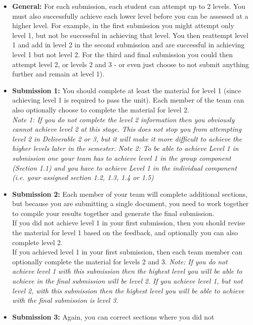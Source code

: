 \documentclass[a4paper, 11pt]{report}
\begin{document}
	\begin{itemize}
		\item \textbf{General:} For each submission, each student can attempt up to 2 
		levels. You must also successfully achieve each lower level before you can be 
		assessed at a higher level. For example, in the first submission you might attempt 
		only level 1, but not be successful in achieving that level. You then reattempt 
		level 1 and add in level 2 in the second submission and are successful in achieving
		level 1 but not level 2. For the third and final submission you could then attempt 
		level 2, or levels 2 and 3 - or even just choose to not submit anything further and
		remain at level 1).
		\item \textbf{Submission 1:} You should complete at least the material for 
		level 1 (since achieving level 1 is required to pass the unit). Each member of the 
		team can also optionally choose to complete the material for level 2.\\
		\textit{Note 1: If you do not complete the level 2 information then you 
			obviously cannot achieve level 2 at this stage. This does not stop you from 
			attempting level 2 in Deliverable 2 or 3, but it will make it more difficult to 
			achieve the higher levels later in the semester.}
		\textit{Note 2: To be able to achieve Level 1 in submission one your team has 
			to achieve level 1 in the group component (Section 1.1) and you have to achieve 
			Level 1 in the individual component (i.e. your assigned section 1.2, 1.3, 1.4 or 
			1.5)}
		\item \textbf{Submission 2:} Each member of your team will complete additional 
		sections, but because you are submitting a single document, you need to work 
		together to compile your results together and generate the final submission.\\
		If you did not achieve level 1 in your first submission, then you should revise
		the material for level 1 based on the feedback, and optionally you can also 
		complete level 2.\\
		If you achieved level 1 in your first submission, then each team member can 
		optionally complete the material for levels 2 and 3.
		\textit{Note: If you do not achieve level 1 with this submission then the 
			highest level you will be able to achieve in the final submission will be level 2. 
			If you achieve level 1, but not level 2, with this submission then the highest 
			level you will be able to achieve with the final submission is level 3.}
		\item \textbf{Submission 3:} Again, you can correct sections where you did not 

\end{itemize}
\end{document}
